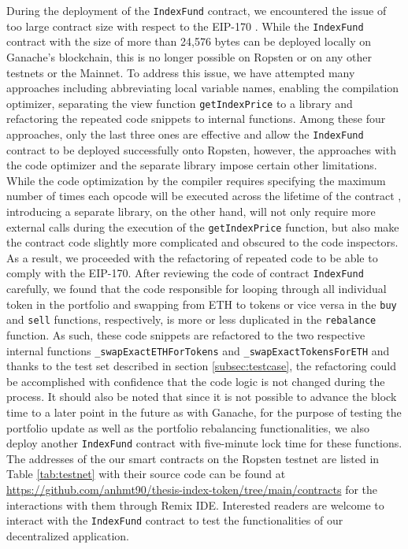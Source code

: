 During the deployment of the \texttt{IndexFund} contract, we encountered the issue of too large contract size with respect to the EIP-170 \cite{eip170}. While the \texttt{IndexFund} contract with the size of more than 24,576 bytes can be deployed locally on Ganache's blockchain, this is no longer possible on Ropsten or on any other testnets or the Mainnet. To address this issue, we have attempted many approaches including abbreviating local variable names, enabling the compilation optimizer, separating the view function \texttt{getIndexPrice} to a library and refactoring the repeated code snippets to internal functions. Among these four approaches, only the last three ones are effective and allow the \texttt{IndexFund} contract to be deployed successfully onto Ropsten, however, the approaches with the code optimizer and the separate library impose certain other limitations. While the code optimization by the compiler requires specifying the maximum number of times each opcode will be executed across the lifetime of the contract \cite{soloptimizer}, introducing a separate library, on the other hand, will not only require more external calls during the execution of the \texttt{getIndexPrice} function, but also make the contract code slightly more complicated and obscured to the code inspectors. As a result, we proceeded with the refactoring of repeated code to be able to comply with the EIP-170. After reviewing the code of contract \texttt{IndexFund} carefully, we found that the code responsible for looping through all individual token in the portfolio and swapping from ETH to tokens or vice versa in the \texttt{buy} and \texttt{sell} functions, respectively,  is more or less duplicated in the \texttt{rebalance} function. As such, these code snippets are refactored to the two respective internal functions \texttt{\_swapExactETHForTokens} and \texttt{\_swapExactTokensForETH} and thanks to the test set described in section \ref{subsec:testcase}, the refactoring could be accomplished with confidence that the code logic is not changed during the process. It should also be noted that since it is not possible to advance the block time to a later point in the future as with Ganache, for the purpose of testing the portfolio update as well as the portfolio rebalancing functionalities, we also deploy another \texttt{IndexFund} contract with five-minute lock time for these functions.
The addresses of the our smart contracts on the Ropsten testnet are listed in Table \ref{tab:testnet} with their source code can be found at \url{https://github.com/anhmt90/thesis-index-token/tree/main/contracts} for the interactions with them through Remix IDE. Interested readers are welcome to interact with the \texttt{IndexFund} contract to test the functionalities of our decentralized application.


